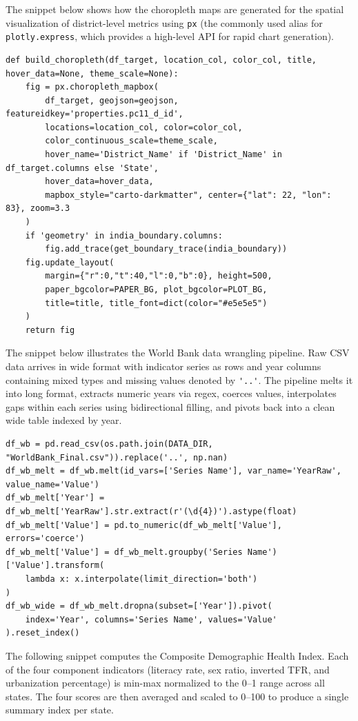 \documentclass[abstract=true]{scrartcl}
\begin{document}
The snippet below shows how the choropleth maps are generated for the spatial visualization of district-level metrics using \verb|px| (the commonly used alias for \verb|plotly.express|, which provides a high-level API for rapid chart generation).

\begin{verbatim}
def build_choropleth(df_target, location_col, color_col, title, hover_data=None, theme_scale=None):
    fig = px.choropleth_mapbox(
        df_target, geojson=geojson, featureidkey='properties.pc11_d_id',
        locations=location_col, color=color_col,
        color_continuous_scale=theme_scale, 
        hover_name='District_Name' if 'District_Name' in df_target.columns else 'State',
        hover_data=hover_data,
        mapbox_style="carto-darkmatter", center={"lat": 22, "lon": 83}, zoom=3.3
    )
    if 'geometry' in india_boundary.columns:
        fig.add_trace(get_boundary_trace(india_boundary))
    fig.update_layout(
        margin={"r":0,"t":40,"l":0,"b":0}, height=500, 
        paper_bgcolor=PAPER_BG, plot_bgcolor=PLOT_BG,
        title=title, title_font=dict(color="#e5e5e5")
    )
    return fig
\end{verbatim}


The snippet below illustrates the World Bank data wrangling pipeline. Raw CSV data arrives in wide format with indicator series as rows and year columns containing mixed types and missing values denoted by \verb|'..'|. The pipeline melts it into long format, extracts numeric years via regex, coerces values, interpolates gaps within each series using bidirectional filling, and pivots back into a clean wide table indexed by year.

\begin{verbatim}
df_wb = pd.read_csv(os.path.join(DATA_DIR, "WorldBank_Final.csv")).replace('..', np.nan)
df_wb_melt = df_wb.melt(id_vars=['Series Name'], var_name='YearRaw', value_name='Value')
df_wb_melt['Year'] = df_wb_melt['YearRaw'].str.extract(r'(\d{4})').astype(float)
df_wb_melt['Value'] = pd.to_numeric(df_wb_melt['Value'], errors='coerce')
df_wb_melt['Value'] = df_wb_melt.groupby('Series Name')['Value'].transform(
    lambda x: x.interpolate(limit_direction='both')
)
df_wb_wide = df_wb_melt.dropna(subset=['Year']).pivot(
    index='Year', columns='Series Name', values='Value'
).reset_index()
\end{verbatim}

The following snippet computes the Composite Demographic Health Index. Each of the four component indicators (literacy rate, sex ratio, inverted TFR, and urbanization percentage) is min-max normalized to the 0--1 range across all states. The four scores are then averaged and scaled to 0--100 to produce a single summary index per state.
\end{document}
